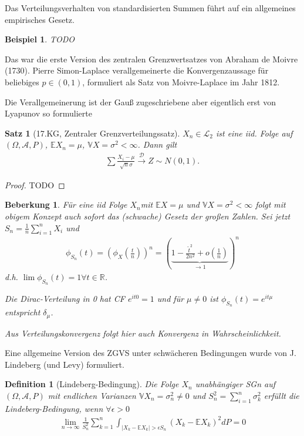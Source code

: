 \documentclass[]{article}
\newtheorem{theorem}{Satz}
\newtheorem{definition}{Definition}
\newtheorem*{remark}{Beberkung}
\newtheorem*{example}{Beispiel}
\begin{document}
Das Verteilungsverhalten von standardisierten Summen führt auf ein allgemeines empirisches Gesetz.

\begin{example}
	TODO
\end{example}

Das war die erste Version des zentralen Grenzwertsatzes von Abraham de Moivre (1730). Pierre Simon-Laplace verallgemeinerte die Konvergenzaussage für beliebiges $p\in(0,1)$, formuliert als Satz von Moivre-Laplace im Jahr 1812.

Die Verallgemeinerung ist der Gauß zugeschriebene aber eigentlich erst von Lyapunov so formulierte
\begin{theorem}[17.KG, Zentraler Grenzverteilungssatz]
	$X_n \in \mathcal{L}_2$ ist eine iid. Folge auf $(\Omega, \mathcal{A}, P)$, $\mathbb{E}X_n = \mu$, $\mathbb{V}X = \sigma^2 < \infty$. Dann gilt
	\begin{align*}
		\sum \frac{X_i - \mu}{\sqrt{n} \sigma} \xrightarrow{\mathcal{D}} Z \sim N(0,1).
	\end{align*}
\end{theorem}

\begin{proof}
	TODO
\end{proof}

\begin{remark}
	Für eine iid Folge $X_n$mit $\mathbb{E}X = \mu$ und $\mathbb{V}X = \sigma^2 < \infty$ folgt mit obigem Konzept auch sofort das (schwache) Gesetz der großen Zahlen. Sei jetzt $S_n = \frac{1}{n} \sum_{i=1}^{n}X_i$ und
	\begin{align*}
		\phi_{S_n}(t) = (\phi_X(\frac{t}{n}))^n = (\underbrace{1- \frac{\tilde{t}^2}{2n^2} + o(\frac{1}{n})}_{\rightarrow 1})^n
	\end{align*}
	d.h. $\lim \phi_{S_n}(t)=1 \forall t \in \mathbb{R}$.
	
	Die Dirac-Verteilung in 0 hat CF $e^{it0} = 1$ und für $\mu\neq 0$ ist $\phi_{S_n}(t)=e^{it\mu}$ entspricht $\delta_\mu$.
	
	Aus Verteilungskonvergenz folgt hier auch Konvergenz in Wahrscheinlichkeit.
\end{remark}

Eine allgemeine Version des ZGVS unter schwächeren Bedingungen wurde von J. Lindeberg (und Levy) formuliert.

\begin{definition}[Lindeberg-Bedingung]
	Die Folge $X_n$ unabhängiger SGn auf $(\Omega, \mathcal{A}, P)$ mit endlichen Varianzen $\mathbb{V}X_n = \sigma_n^2 \neq 0$ und $S_n^2 = \sum_{i=1}^{n} \sigma_k^2$ erfüllt die Lindeberg-Bedingung, wenn $\forall \epsilon > 0$
	\begin{align*}
		\lim\limits_{n\rightarrow\infty} \frac{1}{S_n^2} \sum_{k=1}^{n} \int_{|X_k - \mathbb{E}X_k| > \epsilon S_n} (X_k - \mathbb{E}X_k)^2 dP = 0
	\end{align*}
\end{definition}
\end{document}
